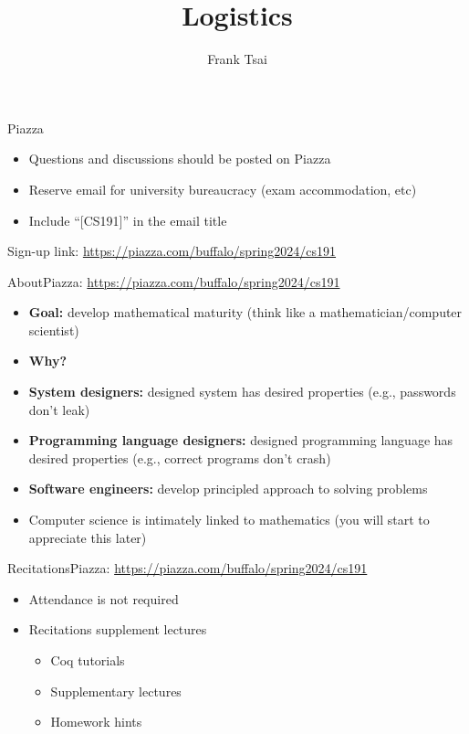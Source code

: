 \documentclass{beamer}
\title{Logistics}
\author[Frank]{Frank Tsai\inst{1}}
\institute{\inst{1} (SUNY at Buffalo)}
\date{}
\begin{document}
\begin{frame}
  \maketitle
\end{frame}

\begin{frame}{Piazza}
  \begin{itemize}
  \item Questions and discussions should be posted on Piazza
  \item Reserve email for university bureaucracy (exam accommodation, etc)
  \item Include ``[CS191]'' in the email title
  \end{itemize}
  \vfill
  Sign-up link: \href{https://piazza.com/buffalo/spring2024/cs191}{https://piazza.com/buffalo/spring2024/cs191}
\end{frame}

\begin{frame}{About}{Piazza: \href{https://piazza.com/buffalo/spring2024/cs191}{https://piazza.com/buffalo/spring2024/cs191}}
  \begin{itemize}
  \item[] \textbf{Goal:} develop mathematical maturity (think like a mathematician/computer scientist)
  \item<2->[] \textbf{Why?}
  \item<3-> \textbf{System designers:} designed system has desired properties (e.g., passwords don't leak)
  \item<4-> \textbf{Programming language designers:} designed programming language has desired properties (e.g., correct programs don't crash)
  \item<5-> \textbf{Software engineers:} develop principled approach to solving problems 
  \item<6-> Computer science is intimately linked to mathematics (you will start to appreciate this later)
  \end{itemize}
\end{frame}

\begin{frame}{Recitations}{Piazza: \href{https://piazza.com/buffalo/spring2024/cs191}{https://piazza.com/buffalo/spring2024/cs191}}
  \begin{itemize}
  \item Attendance is not required
  \item Recitations supplement lectures
    \begin{itemize}
    \item<2-> Coq tutorials
    \item<2-> Supplementary lectures
    \item<2-> Homework hints
    \end{itemize}
  \end{itemize}
\end{frame}
\end{document}
